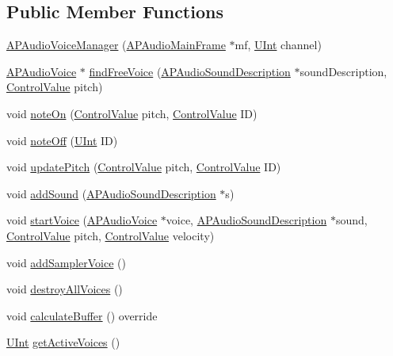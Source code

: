 \subsection*{Public Member Functions}
\begin{DoxyCompactItemize}
\item 
\hyperlink{class_a_p_audio_voice_manager_ae34297343b744525fea2d52a0453b94a}{A\+P\+Audio\+Voice\+Manager} (\hyperlink{class_a_p_audio_main_frame}{A\+P\+Audio\+Main\+Frame} $\ast$mf, \hyperlink{_a_p_audio_module_8h_a9cc0620fb2e91b51587c6936060d4161}{U\+Int} channel)
\item 
\hyperlink{class_a_p_audio_voice}{A\+P\+Audio\+Voice} $\ast$ \hyperlink{class_a_p_audio_voice_manager_a481b2d864153250f25ef94721937b1b4}{find\+Free\+Voice} (\hyperlink{class_a_p_audio_sound_description}{A\+P\+Audio\+Sound\+Description} $\ast$sound\+Description, \hyperlink{_a_p_audio_module_8h_a9219378a2632ccf0389d00317ce8cdc4}{Control\+Value} pitch)
\item 
void \hyperlink{class_a_p_audio_voice_manager_a6ba625401b9c6c3ce347e5fb66c88a0b}{note\+On} (\hyperlink{_a_p_audio_module_8h_a9219378a2632ccf0389d00317ce8cdc4}{Control\+Value} pitch, \hyperlink{_a_p_audio_module_8h_a9219378a2632ccf0389d00317ce8cdc4}{Control\+Value} I\+D)
\item 
void \hyperlink{class_a_p_audio_voice_manager_a38206c6acb123bb6687103de073e2cdf}{note\+Off} (\hyperlink{_a_p_audio_module_8h_a9cc0620fb2e91b51587c6936060d4161}{U\+Int} I\+D)
\item 
void \hyperlink{class_a_p_audio_voice_manager_a54341a861884214078d658253cc104b7}{update\+Pitch} (\hyperlink{_a_p_audio_module_8h_a9219378a2632ccf0389d00317ce8cdc4}{Control\+Value} pitch, \hyperlink{_a_p_audio_module_8h_a9219378a2632ccf0389d00317ce8cdc4}{Control\+Value} I\+D)
\item 
void \hyperlink{class_a_p_audio_voice_manager_a3c2c148baa9205a99abc3036d801694e}{add\+Sound} (\hyperlink{class_a_p_audio_sound_description}{A\+P\+Audio\+Sound\+Description} $\ast$s)
\item 
void \hyperlink{class_a_p_audio_voice_manager_ac06498da7a38c87d4cc72fd44ce4b2ef}{start\+Voice} (\hyperlink{class_a_p_audio_voice}{A\+P\+Audio\+Voice} $\ast$voice, \hyperlink{class_a_p_audio_sound_description}{A\+P\+Audio\+Sound\+Description} $\ast$sound, \hyperlink{_a_p_audio_module_8h_a9219378a2632ccf0389d00317ce8cdc4}{Control\+Value} pitch, \hyperlink{_a_p_audio_module_8h_a9219378a2632ccf0389d00317ce8cdc4}{Control\+Value} velocity)
\item 
void \hyperlink{class_a_p_audio_voice_manager_aa57022af78e9b348b20159e27ae15320}{add\+Sampler\+Voice} ()
\item 
void \hyperlink{class_a_p_audio_voice_manager_a199d3d41d181ac4fc983f25ae5a30b94}{destroy\+All\+Voices} ()
\item 
void \hyperlink{class_a_p_audio_voice_manager_a27033002e3ab86c55ec5d1e5150d1892}{calculate\+Buffer} () override
\item 
\hyperlink{_a_p_audio_module_8h_a9cc0620fb2e91b51587c6936060d4161}{U\+Int} \hyperlink{class_a_p_audio_voice_manager_a9cbeb96228989601bede52821b8c829a}{get\+Active\+Voices} ()
\end{DoxyCompactItemize}
